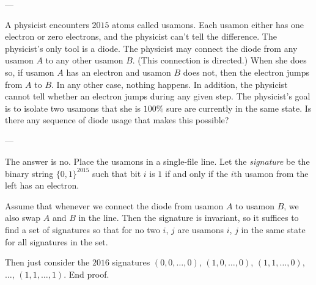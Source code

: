 
---

A physicist encounters $2015$ atoms called usamons. Each usamon either has one electron or zero electrons, and the physicist can't tell the difference. The physicist's only tool is a diode. The physicist may connect the diode from any usamon $A$ to any other usamon $B$. (This connection is directed.) When she does so, if usamon $A$ has an electron and usamon $B$ does not, then the electron jumps from $A$ to $B$. In any other case, nothing happens. In addition, the physicist cannot tell whether an electron jumps during any given step. The physicist's goal is to isolate two usamons that she is $100\%$ sure are currently in the same state. Is there any sequence of diode usage that makes this possible?

---

The answer is no. Place the usamons in a single-file line. Let the \emph{signature} be the binary string $\{0,1\}^{2015}$ such that bit $i$ is $1$ if and only if the $i$th usamon from the left has an electron.

Assume that whenever we connect the diode from usamon $A$ to usamon $B$, we also swap $A$ and $B$ in the line. Then the signature is invariant, so it suffices to find a set of signatures so that for no two $i$, $j$ are usamons $i$, $j$ in the same state for all signatures in the set.

Then just consider the $2016$ signatures $(0,0,\ldots,0)$, $(1,0,\ldots,0)$, $(1,1,\ldots,0)$, $\ldots$, $(1,1,\ldots,1)$. End proof.

